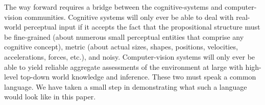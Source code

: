The way forward requires a bridge between the cognitive-systems and
computer-vision communities.
%
Cognitive systems will only ever be able to deal with real-world perceptual
input if it accepts the fact that the propositional structure must be
fine-grained (about numerous small perceptual entities that comprise any
cognitive concept), metric (about actual sizes, shapes, positions, velocities,
accelerations, forces, etc.), and noisy.
%
Computer-vision systems will only ever be able to yield reliable aggregate
assessments of the environment at large with high-level top-down world
knowledge and inference.
%
These two must speak a common language.
%
We have taken a small step in demonstrating what such a language would look
like in this paper.
